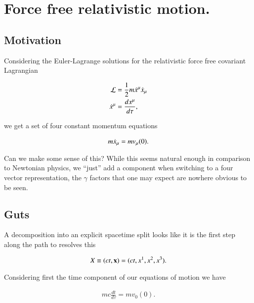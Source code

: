 %

\chapter{Force free relativistic motion.}
\label{chap:constFourMomentum}
{}
\date{Nov 15, 2009}

\beginArtNoToc

\section{Motivation}

Considering the Euler-Lagrange solutions for the relativistic force free covariant Lagrangian

\begin{align}\label{eqn:constFourMomentum:qqq1}
\mathcal{L} &= \frac{1}{2} m \dot{x}^\mu \dot{x}_\mu \\
\dot{x}^\mu &= \frac{d x^\mu}{d \tau},
\end{align}

we get a set of four constant momentum equations

\begin{align}\label{eqn:constFourMomentum:qqq5}
m \dot{x}_\mu = m v_\mu(0).
\end{align}

Can we make some sense of this?  While this seems natural enough in comparison to Newtonian physics, we ``just'' add a component when switching to a four vector representation, the $\gamma$ factors that one may expect are nowhere obvious to be seen.  

\section{Guts}

A decomposition into an explicit spacetime split looks like it is the first step along the path to resolves this

\begin{align}\label{eqn:constFourMomentum:qqq6}
X \equiv (c t, \mathbf{x}) = (ct, x^1, x^2, x^3).
\end{align}

Considering first the time component of our equations of motion we have

\begin{align}\label{eqn:constFourMomentum:qqq7}
m c \frac{dt}{d\tau} = m v_0(0).
\end{align}

